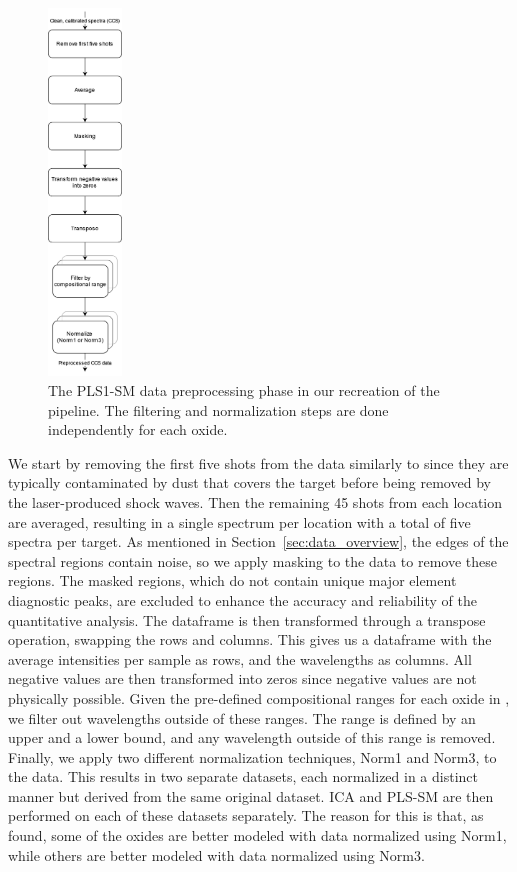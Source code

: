 \begin{figure}
	\centering
	\includegraphics[width=0.175\textwidth]{images/pls_preprocessing.png}
	\caption{The PLS1-SM data preprocessing phase in our recreation of the pipeline. The filtering and normalization steps are done independently for each oxide.}
	\label{fig:pls_data_preprocessing}
\end{figure}
\noindent
We start by removing the first five shots from the data similarly to \citet{cleggRecalibrationMarsScience2017} since they are typically contaminated by dust that covers the target before being removed by the laser-produced shock waves.
Then the remaining 45 shots from each location are averaged, resulting in a single spectrum per location with a total of five spectra per target.
As mentioned in Section~\ref{sec:data_overview}, the edges of the spectral regions contain noise, so we apply masking to the data to remove these regions.
The masked regions, which do not contain unique major element diagnostic peaks, are excluded to enhance the accuracy and reliability of the quantitative analysis\cite{cleggRecalibrationMarsScience2017}.
The dataframe is then transformed through a transpose operation, swapping the rows and columns.
This gives us a dataframe with the average intensities per sample as rows, and the wavelengths as columns.
All negative values are then transformed into zeros since negative values are not physically possible.
Given the pre-defined compositional ranges for each oxide in \citet{andersonImprovedAccuracyQuantitative2017}, we filter out wavelengths outside of these ranges.
The range is defined by an upper and a lower bound, and any wavelength outside of this range is removed.
Finally, we apply two different normalization techniques, Norm1 and Norm3, to the data.
This results in two separate datasets, each normalized in a distinct manner but derived from the same original dataset.
ICA and PLS-SM are then performed on each of these datasets separately.
The reason for this is that, as \citet{cleggRecalibrationMarsScience2017} found, some of the oxides are better modeled with data normalized using Norm1, while others are better modeled with data normalized using Norm3.

